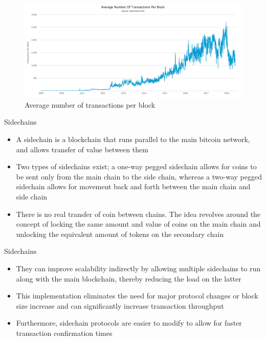 \documentclass[10pt]{beamer}
\begin{document}
\begin{frame}{}
	\begin{figure}[]
		\centering
		\includegraphics  [scale=0.25]{Images/average-number-of-transactions-per-block}
		\caption{Average number of transactions per block}
	\end{figure}
\end{frame}

\begin{frame}{Sidechains}
	\begin{itemize}
		\item A sidechain is a blockchain that runs parallel to the main bitcoin network, and allows transfer of value between them
		\item Two types of sidechains exist; a one-way pegged sidechain allows for coins to be sent only from the main chain to the side chain, whereas a two-way pegged sidechain allows for movement back and forth between the main chain and side chain
		\item There is no real transfer of coin between chains. The idea revolves around the concept of locking the same amount and value of coins on the main chain and unlocking the equivalent amount of tokens on the secondary chain
	\end{itemize}
\end{frame}


\begin{frame}{Sidechains}
	\begin{itemize}
		\item They can improve scalability indirectly by allowing multiple sidechains to run along with the main blockchain, thereby reducing the load on the latter
		\item This implementation eliminates the need for major protocol changes or block size increase and can significantly increase transaction throughput
		\item Furthermore, sidechain protocols are easier to modify to allow for faster transaction confirmation times
	\end{itemize}
\end{frame}
\end{document}

